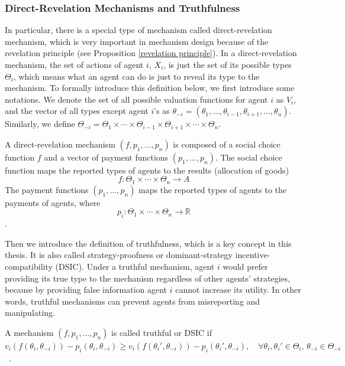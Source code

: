 \documentclass[11pt]{phdthesis}
\begin{document}
\subsubsection{Direct-Revelation Mechanisms and Truthfulness} \label{direct-revelation mechanisms and truthfulness}
In particular, there is a special type of mechanism called direct-revelation mechanism, which is very important in mechanism design because of the revelation principle (see Proposition \ref{revelation principle}). In a direct-revelation mechanism, the set of actions of agent $i$, $X_i$, is just the set of its possible types $ \Theta_i $, which means what an agent can do is just to reveal its type to the mechanism.  To formally introduce this definition below, we first introduce some notations. We denote the set of all possible valuation functions for agent $i$ as $V_i$, and the vector of all types except agent $i$'s as $\theta_{-i} = (\theta_1,\ldots,\theta_{i-1},\theta_{i+1},\ldots,\theta_n)$. Similarly, we define $\Theta_{-i} = \Theta_1 \times \cdots \times \Theta_{i-1} \times \Theta_{i+1} \times \cdots \times \Theta_n$.

\begin{definition} 
	A direct-revelation mechanism $(f,p_1,...,p_n)$ is composed of a social choice function $f$ and a vector of payment functions $(p_1,...,p_n)$.
	The social choice function maps the reported types of agents to the results (allocation of goods)
	$$f : \Theta_1 \times \cdots \times \Theta_n \rightarrow A$$ 
	The payment functions $(p_1,...,p_n)$ maps the reported types of agents to the payments of agents, where
	$$p_i : \Theta_1 \times \cdots \times \Theta_n \rightarrow \mathbb{R}$$
	\citep[Definition 9.14]{nisan2007algorithmic}.
\end{definition}

Then we introduce the definition of truthfulness, which is a key concept in this thesis. It is also called strategy-proofness or dominant-strategy incentive-compatibility (DSIC). Under a truthful mechanism, agent $i$ would prefer providing its true type to the mechanism regardless of other agents' strategies, because by providing false information agent $i$ cannot increase its utility. In other words, truthful mechanisms can prevent agents from misreporting and manipulating.

\begin{definition}[truthfulness]
	A mechanism $(f,p_1,...,p_n)$ is called truthful or DSIC  if $v_i(f(\theta_i, \theta_{-i})) - p_i(\theta_i, \theta_{-i}) \geq v_i(f(\theta_i', \theta_{-i})) - p_i(\theta_i',  \theta_{-i}), \quad \forall \theta_i , \theta_i' \in \Theta_i ,\, \theta_{-i} \in \Theta_{-i} $~\citep[Definition 9.15]{nisan2007algorithmic}.
\end{definition}
\end{document}
